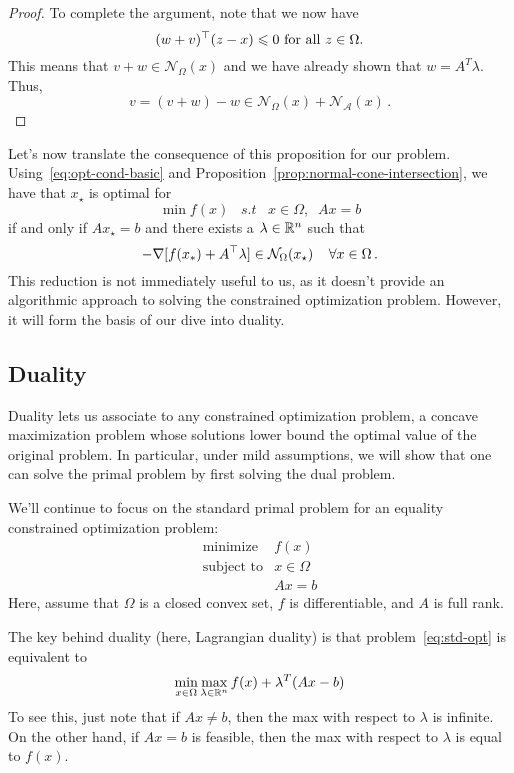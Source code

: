 \documentclass[12pt]{article}
\begin{document}
\begin{proof}
To complete the argument, note that we now have
\[
 	 (w+v)^\top (z-x)  \leqslant 0 \text{ for all $z \in \Omega$.}
\]
This means that $v+w \in \mathcal{N}_{\Omega}(x)$ and we have already shown that $w = A^T\lambda$. Thus, 
\[
v = (v+w)-w \in \mathcal{N}_{\Omega}(x) + \mathcal{N}_{\mathcal{A}}(x)\,.
\]
\end{proof}



Let's now translate the consequence of this proposition for our problem.  Using~\eqref{eq:opt-cond-basic} and Proposition~\ref{prop:normal-cone-intersection}, we have that $x_\star$ is optimal for 
 $$ \min f(x)\;\;\; s.t \;\;\; x \in \Omega, \;\; Ax = b$$ 
 if and only if  $Ax_\star = b$ and there exists a $\lambda \in \mathbb{R}^n$ such that 
 $$ - \nabla [f(x_*) + A^\top \lambda] \in \mathcal{N}_{\Omega} (x_\star) \;\;\;\; \forall x \in \Omega\,.$$
 This reduction is not immediately useful to us, as it doesn't provide an algorithmic approach to solving the constrained optimization problem.  However, it will form the basis of our dive into duality.
 
 
\subsection{Duality}
 
 Duality lets us associate to any constrained optimization problem, a concave maximization problem whose solutions lower bound the optimal value of the original problem.  In particular, under mild assumptions, we will show that one can solve the primal problem by first solving the dual problem.  
 
We'll continue to focus on the standard primal problem for an equality constrained optimization problem:
  \begin{equation}\label{eq:std-opt}
  \begin{array}{ll}
  \text{minimize} & f(x) \\
  \text{subject to} & x\in\Omega\\
  &Ax = b
    \end{array}
  \end{equation}
 Here, assume that $\Omega$ is a closed convex set, $f$ is differentiable, and $A$ is full rank.
 
 The key behind duality (here, Lagrangian duality) is that problem~\eqref{eq:std-opt} is equivalent to
\[
\min_{x \in \Omega} \max_{\lambda \in \mathbb{R}^n} f(x) + \lambda^T(Ax-b)
\]
To see this, just note that if $Ax\neq b$, then the max with respect to $\lambda$ is infinite.  On the other hand, if $Ax=b$ is feasible, then the max with respect to $\lambda$ is equal to $f(x)$.
 
\end{document}

